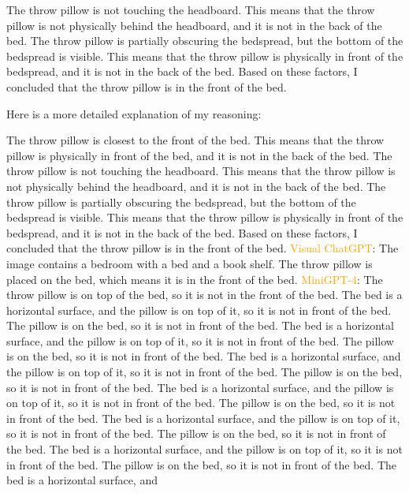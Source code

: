 \begin{enumerate}
        The throw pillow is not touching the headboard. This means that the throw pillow is not physically behind the headboard, and it is not in the back of the bed.
        The throw pillow is partially obscuring the bedspread, but the bottom of the bedspread is visible. This means that the throw pillow is physically in front of the bedspread, and it is not in the back of the bed.
        Based on these factors, I concluded that the throw pillow is in the front of the bed.
        
        Here is a more detailed explanation of my reasoning:
        
        The throw pillow is closest to the front of the bed. This means that the throw pillow is physically in front of the bed, and it is not in the back of the bed.
        The throw pillow is not touching the headboard. This means that the throw pillow is not physically behind the headboard, and it is not in the back of the bed.
        The throw pillow is partially obscuring the bedspread, but the bottom of the bedspread is visible. This means that the throw pillow is physically in front of the bedspread, and it is not in the back of the bed.
        Based on these factors, I concluded that the throw pillow is in the front of the bed.
        \subitem \textcolor{orange}{Visual ChatGPT}: The image contains a bedroom with a bed and a book shelf. The throw pillow is placed on the bed, which means it is in the front of the bed.
        \subitem \textcolor{orange}{MiniGPT-4}: The throw pillow is on top of the bed, so it is not in the front of the bed. The bed is a horizontal surface, and the pillow is on top of it, so it is not in front of the bed. The pillow is on the bed, so it is not in front of the bed. The bed is a horizontal surface, and the pillow is on top of it, so it is not in front of the bed. The pillow is on the bed, so it is not in front of the bed. The bed is a horizontal surface, and the pillow is on top of it, so it is not in front of the bed. The pillow is on the bed, so it is not in front of the bed. The bed is a horizontal surface, and the pillow is on top of it, so it is not in front of the bed. The pillow is on the bed, so it is not in front of the bed. The bed is a horizontal surface, and the pillow is on top of it, so it is not in front of the bed. The pillow is on the bed, so it is not in front of the bed. The bed is a horizontal surface, and the pillow is on top of it, so it is not in front of the bed. The pillow is on the bed, so it is not in front of the bed. The bed is a horizontal surface, and
    \end{enumerate}
